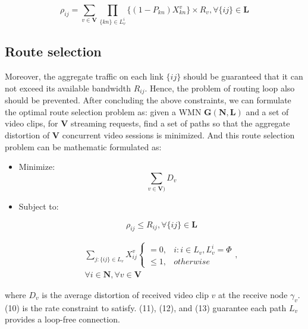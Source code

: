 \begin{equation} \rho_{ij} = \sum_{v \in \mathbf{V}} \prod_{{\lbrace
kn \rbrace \in L_v^i}} \lbrace(1- P_{kn})X ^{v}_{kn}\rbrace \times
R_v , \forall \lbrace ij \rbrace \in \mathbf{L} \end{equation}

\subsection{Route selection} Moreover, the aggregate traffic
on each link $\lbrace ij \rbrace$ should be guaranteed that it can
not exceed its available bandwidth $R_{ij}$. Hence, the problem of
routing loop also should be prevented. After concluding the above
constraints, we can formulate the optimal route selection problem
as: given a WMN $\mathbf{G(N,L)}$ and a set of video clips, for
$\mathbf{V}$ streaming requests, find a set of paths so that the
aggregate distortion of $\mathbf{V}$ concurrent video sessions is
minimized. And this route selection problem can be mathematic
formulated as:

\begin{itemize}
\item Minimize:
\begin{equation}
\sum_{v \in \mathbf{V)}} D_v
\end{equation}
\item Subject to:

\begin{equation}
\rho_{ij} \le R_{ij}, \forall \lbrace ij \rbrace \in \mathbf{L}
\end{equation}

\begin{eqnarray}
\sum_{j:\lbrace ij \rbrace \in L_v} X_{ij}^v
\left\{\begin{array}{ll}
  =0,    & i: i \in L_v, L_v^i = \Phi\\
  \le1,  & otherwise
\end{array} \right.,\nonumber\\
\forall i \in \mathbf{N}, \forall v \in \mathbf{V}
\end{eqnarray}

\end{itemize}

where $D_v$ is the average distortion of received video clip $v$
at the receive node $\gamma_v$. (10) is the rate constraint to
satisfy. (11), (12), and (13) guarantee each path $L_v$ provides a
loop-free connection.
